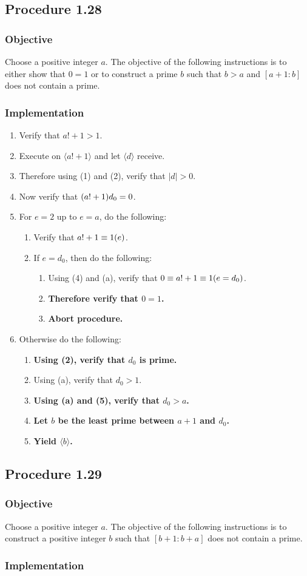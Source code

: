 \documentclass[twocolumn]{article}
\let\mod\relax
\DeclareMathOperator{\mod}{mod}
\newcommand{\procedure}[2][]{\subsection*{Procedure #2 \ifthenelse{\equal{#1}{}}{}{(#1)}}\label{sec:procedure #2}}
\newcommand{\objective}{\subsubsection*{Objective}}
\newcommand{\implementation}{\subsubsection*{Implementation}}
\newcommand{\procedurehr}[2][]{\hyperref[sec:procedure #2]{\ifthenelse{\equal{#1}{}}{procedure #2}{#1}}}
\begin{document}
		\procedure{1.28}
			\objective
				Choose a positive integer $a$. The objective of the following instructions is to either show that $0=1$ or to construct a prime $b$ such that $b>a$ and $[a+1:b]$ does not contain a prime.
			\implementation
				\begin{enumerate}
					\item Verify that $a!+1>1$.
					\item Execute \procedurehr{1.24} on $\langle a!+1\rangle$ and let $\langle d\rangle$ receive.
					\item Therefore using (1) and (2), verify that $\lvert d\rvert>0$.
					\item Now verify that $(a!+1)\mod d_0=0$.
					\item For $e=2$ up to $e=a$, do the following:
					\begin{enumerate}
						\item Verify that $a!+1\equiv 1 (\mod e)$.
						\item If $e=d_0$, then do the following:
						\begin{enumerate}
							\item Using (4) and (a), verify that $0\equiv a!+1\equiv 1(\mod e=d_0)$.
							\item \textbf{Therefore verify that $0=1$.}
							\item \textbf{Abort procedure.}
						\end{enumerate}
					\end{enumerate}
					\item Otherwise do the following:
					\begin{enumerate}
						\item \textbf{Using (2), verify that $d_0$ is prime.}
						\item Using (a), verify that $d_0>1$.
						\item \textbf{Using (a) and (5), verify that $d_0>a$.}
						\item \textbf{Let $b$ be the least prime between $a+1$ and $d_0$.}
						\item \textbf{Yield $\langle b\rangle$.}
					\end{enumerate}
				\end{enumerate}
		\procedure{1.29}
			\objective
				Choose a positive integer $a$. The objective of the following instructions is to construct a positive integer $b$ such that $[b+1:b+a]$ does not contain a prime.
			\implementation
\end{document}
